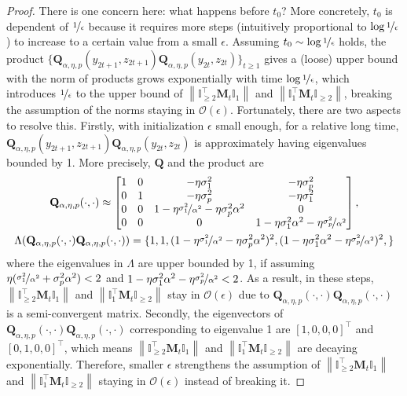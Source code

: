 \documentclass{article}
\theoremstyle{plain}
\theoremstyle{remark}
\newcommand{\norm}[1]{\left\lVert#1\right\rVert}
\def\O{\mathcal{O}}
\begin{document}
\begin{proof}
    There is one concern here: what happens before $t_0$? More concretely, $t_0$ is dependent of $\nicefrac{1}{\epsilon}$ because it requires more steps (intuitively proportional to $\log\nicefrac{1}{\epsilon}$) to increase to a certain value from a small $\epsilon$. Assuming $t_0\sim \log\nicefrac{1}{\epsilon}$ holds, the product $\{\mathbf{Q}_{\alpha,\eta,p}(y_{2t+1}, z_{2t+1})\mathbf{Q}_{\alpha,\eta,p}(y_{2t}, z_{2t})\}_{t\ge 1}$ gives a (loose) upper bound with the norm of products grows exponentially with time $\log\nicefrac{1}{\epsilon}$, which introduces $\nicefrac{1}{\epsilon}$ to the upper bound of $\norm{\mathbb{I}_{\ge2}^\top\mathbf{M}_{t}\mathbb{I}_1}$ and $\norm{\mathbb{I}_{1}^\top\mathbf{M}_{t}\mathbb{I}_{\ge2}}$, breaking the assumption of the norms staying in $\O(\epsilon)$. Fortunately, there are two aspects to resolve this. Firstly, with initialization $\epsilon$ small enough, for a relative long time, $\mathbf{Q}_{\alpha,\eta,p}(y_{2t+1}, z_{2t+1})\mathbf{Q}_{\alpha,\eta,p}(y_{2t}, z_{2t})$ is approximately having eigenvalues bounded by 1. More precisely, $\mathbf{Q}$ and the product are
    \begin{gather}
        \mathbf{Q}_{\alpha,\eta,p}(\cdot, \cdot)
        \approx 
        \begin{bmatrix}
            1 & 0 & -\eta\sigma_1^2 & -\eta\sigma_p^2 \\
            0 & 1 & -\eta\sigma_p^2 & -\eta\sigma_1^2 \\
            0 & 0 & 1-\eta \nicefrac{\sigma_1^2}{\alpha^2}-\eta\sigma_p^2\alpha^2 & 0 \\
            0 & 0 & 0 & 1-\eta \sigma_1^2\alpha^2-\eta\nicefrac{\sigma_p^2}{\alpha^2}
        \end{bmatrix},
        \\
        \Lambda(\mathbf{Q}_{\alpha,\eta,p}(\cdot, \cdot)\mathbf{Q}_{\alpha,\eta,p}(\cdot, \cdot))
        =
        \{
            1, 1, (1-\eta \nicefrac{\sigma_1^2}{\alpha^2}-\eta\sigma_p^2\alpha^2)^2, (1-\eta \sigma_1^2\alpha^2-\eta\nicefrac{\sigma_p^2}{\alpha^2})^2,
        \}
        \label{eq:quasi_q_lambda}
    \end{gather}
    where the eigenvalues in $\Lambda$ are upper bounded by 1, if assuming $\eta(\nicefrac{\sigma_1^2}{\alpha^2}+\sigma_p^2\alpha^2)<2$ and $1-\eta \sigma_1^2\alpha^2-\eta\nicefrac{\sigma_p^2}{\alpha^2}<2$. As a result, in these steps, $\norm{\mathbb{I}_{\ge2}^\top\mathbf{M}_{t}\mathbb{I}_1}$ and $\norm{\mathbb{I}_{1}^\top\mathbf{M}_{t}\mathbb{I}_{\ge2}}$ stay in $\O(\epsilon)$ due to $\mathbf{Q}_{\alpha,\eta,p}(\cdot, \cdot)\mathbf{Q}_{\alpha,\eta,p}(\cdot, \cdot)$ is a semi-convergent matrix. Secondly, the eigenvectors of $\mathbf{Q}_{\alpha,\eta,p}(\cdot, \cdot)\mathbf{Q}_{\alpha,\eta,p}(\cdot, \cdot)$ corresponding to eigenvalue 1 are $[1,0,0,0]^\top$ and $[0,1,0,0]^\top$, which means $\norm{\mathbb{I}_{\ge2}^\top\mathbf{M}_{t}\mathbb{I}_1}$ and $\norm{\mathbb{I}_{1}^\top\mathbf{M}_{t}\mathbb{I}_{\ge2}}$ are decaying exponentially. Therefore, smaller $\epsilon$ strengthens the assumption of $\norm{\mathbb{I}_{\ge2}^\top\mathbf{M}_{t}\mathbb{I}_1}$ and $\norm{\mathbb{I}_{1}^\top\mathbf{M}_{t}\mathbb{I}_{\ge2}}$ staying in $\O(\epsilon)$ instead of breaking it.


\end{proof}
\end{document}
